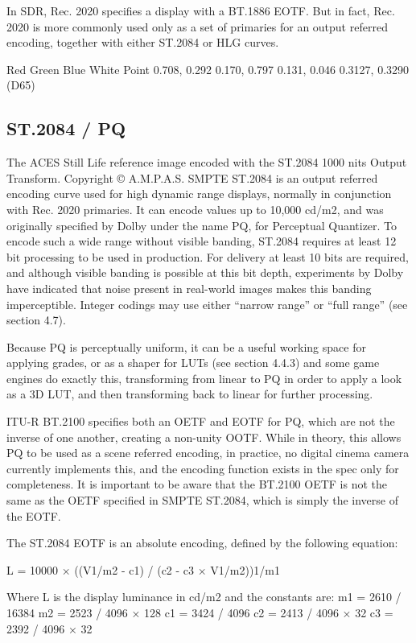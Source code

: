 In SDR, Rec. 2020 specifies a display with a BT.1886 EOTF. But in fact, Rec. 2020 is more commonly used only as a set of primaries for an output referred encoding, together with either ST.2084 or HLG curves.

Red
Green
Blue
White Point
0.708, 0.292
0.170, 0.797
0.131, 0.046
0.3127, 0.3290 (D65)

\subsection{ST.2084 / PQ}
\label{subsec:st-2084-pq}

The ACES Still Life reference image encoded with the ST.2084 1000 nits Output Transform.
Copyright © A.M.P.A.S.
SMPTE ST.2084 is an output referred encoding curve used for high dynamic range displays, normally in conjunction with Rec. 2020 primaries. It can encode values up to 10,000 cd/m2, and was originally specified by Dolby under the name PQ, for Perceptual Quantizer. To encode such a wide range without visible banding, ST.2084 requires at least 12 bit processing to be used in production. For delivery at least 10 bits are required, and although visible banding is possible at this bit depth, experiments by Dolby have indicated that noise present in real-world images makes this banding imperceptible. Integer codings may use either “narrow range” or “full range” (see section 4.7).

Because PQ is perceptually uniform, it can be a useful working space for applying grades, or as a shaper for LUTs (see section 4.4.3) and some game engines do exactly this, transforming from linear to PQ in order to apply a look as a 3D LUT, and then transforming back to linear for further processing.

ITU-R BT.2100 specifies both an OETF and EOTF for PQ, which are not the inverse of one another, creating a non-unity OOTF. While in theory, this allows PQ to be used as a scene referred encoding, in practice, no digital cinema camera currently implements this, and the encoding function exists in the spec only for completeness. It is important to be aware that the BT.2100 OETF is not the same as the OETF specified in SMPTE ST.2084, which is simply the inverse of the EOTF.

The ST.2084 EOTF is an absolute encoding, defined by the following equation:

	L = 10000 × ((V1/m2 - c1) / (c2 - c3 × V1/m2))1/m1

Where L is the display luminance in cd/m2 and the constants are:
	m1 = 2610 / 16384
	m2 = 2523 / 4096 × 128
	c1 = 3424 / 4096
	c2 = 2413 / 4096 × 32
	c3 = 2392 / 4096 × 32



